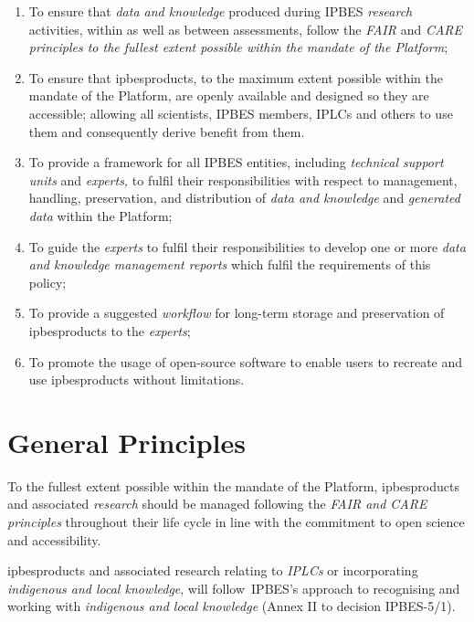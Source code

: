 \documentclass{article}
\begin{document}
\begin{enumerate}[label=(\alph*)]
    \item To ensure that \textit{data and knowledge} produced during IPBES \textit{research }activities, within as well as between assessments, follow the \textit{FAIR }and \textit{CARE principles to the fullest extent possible within the mandate of the Platform};
    
    \item To ensure that \gls{ipbesproducts}, to the maximum extent possible within the mandate of the Platform, are openly available and designed so they are accessible; allowing all scientists, IPBES members, IPLCs and others to use them and consequently derive benefit from them.
    
    \item To provide a framework for all IPBES entities, including \textit{technical support units} and \textit{experts, }to fulfil their responsibilities with respect to management, handling, preservation, and distribution of \textit{data and knowledge }and \textit{generated data} within the Platform;
    
    \item To guide the \textit{experts }to fulfil their responsibilities to develop one or more \textit{data and knowledge management reports }which fulfil the requirements of this policy;
    
    \item To provide a suggested \textit{workflow} for long-term storage and preservation of \gls{ipbesproducts} to the \textit{experts};
    
    \item To promote the usage of open-source software to enable users to recreate and use \gls{ipbesproducts} without limitations.
\end{enumerate}


\section{General Principles}

To the fullest extent possible within the mandate of the Platform, \gls{ipbesproducts} and associated \textit{research} should be managed following the \textit{FAIR and CARE principles} throughout their life cycle in line with the commitment to open science and accessibility.

\gls{ipbesproducts} and associated research relating to \textit{IPLCs} or incorporating \textit{indigenous and local knowledge}, will follow IPBES’s approach to recognising and working with \textit{indigenous and local knowledge }(Annex II to decision IPBES-5/1).
\end{document}
